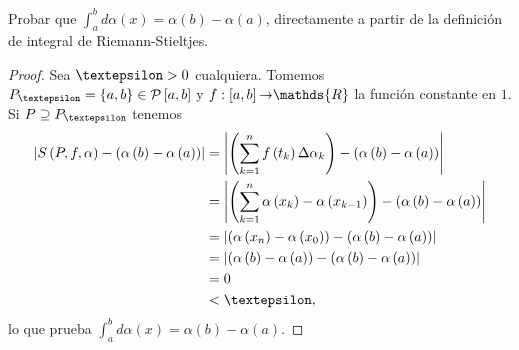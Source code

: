 \setcounter{section}{7}
\setcounter{exercise}{0}

\begin{exercise}
  \label{exercise:7.1}
  Probar que $\int_{a}^{b}d\alpha\left(x\right)=\alpha\left(b\right)-\alpha\left(a\right)$, directamente a partir de la definición de integral de Riemann-Stieltjes.
\end{exercise}

\begin{proof}

Sea $\text{\textepsilon}>0$ cualquiera. Tomemos $P_{\text{\textepsilon}}=\left\lbrace a,b\right\rbrace\in\mathcal{P}\left[a,b\right]$ y $f:\left[a,b\right]\text{\textrightarrow}\mathds{R}$ la función constante en $1$. Si $P\supseteq P_{\text{\textepsilon}}$ tenemos
\begin{align*}
  \left| S\left(P,f,\alpha\right)-\left(\alpha\left(b\right)-\alpha\left(a\right)\right)\right|&=\left|\left(\sum_{k=1}^{n}f\left(t_k\right)\Delta\alpha_k\right)-\left(\alpha\left(b\right)-\alpha\left(a\right)\right) \right|\\
  &=\left|\left(\sum_{k=1}^{n} \alpha\left(x_k\right)-\alpha\left(x_{k-1}\right)\right)-\left(\alpha\left(b\right)-\alpha\left(a\right)\right)\right|\\
  &=\left|\left(\alpha\left(x_n\right)-\alpha\left(x_0\right)\right)-\left(\alpha\left(b\right)-\alpha\left(a\right)\right)\right|\\
  &=\left|\left(\alpha\left(b\right)-\alpha\left(a\right)\right)-\left(\alpha\left(b\right)-\alpha\left(a\right)\right)\right|\\
  &=0\\
  &<\text{\textepsilon},
\end{align*}
lo que prueba $\int_{a}^{b}d\alpha\left(x\right)=\alpha\left(b\right)-\alpha\left(a\right)$.
  
\end{proof}
